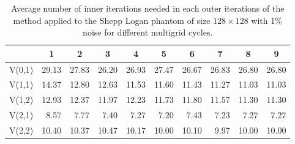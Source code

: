 \begin{table}[htp]
\caption{Average number of inner iterations needed in each outer iterations of the method applied to the Shepp Logan phantom of size $128 \times 128$ with 1\% noise for different multigrid cycles.}
\begin{center}
\begin{tabular}{|l|r|r|r|r|r|r|r|r|r|}
\hline
& \multicolumn{1}{c|}{1} & \multicolumn{1}{c|}{2} & \multicolumn{1}{c|}{3} & \multicolumn{1}{c|}{4} & \multicolumn{1}{c|}{5} & \multicolumn{1}{c|}{6} & \multicolumn{1}{c|}{7} & \multicolumn{1}{c|}{8} & \multicolumn{1}{c|}{9} \\
\hline
V(0,1) & 29.13 & 27.83 & 26.20 & 26.93 & 27.47 & 26.67 & 26.83 & 26.80 & 26.80 \\
V(1,1) & 14.37 & 12.80 & 12.63 & 11.53 & 11.60 & 11.43 & 11.27 & 11.03 & 11.03 \\
V(1,2) & 12.93 & 12.37 & 11.97 & 12.23 & 11.73 & 11.80 & 11.57 & 11.30 & 11.30 \\
V(2,1) & 8.57 & 7.77 & 7.40 & 7.27 & 7.20 & 7.43 & 7.23 & 7.27 & 7.27 \\
V(2,2) & 10.40 & 10.37 & 10.47 & 10.17 & 10.00 & 10.10 & 9.97 & 10.00 & 10.00 \\
\hline
\end{tabular}
\end{center}
\label{tab:its_cycling}
\end{table}%


